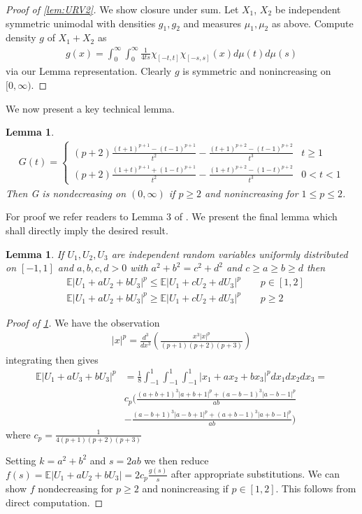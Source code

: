 \documentclass[10pt]{article}
\newcommand{\E}{\mathbb{E}}
\newcommand{\1}{\textbf{1}}
\newtheorem{lemma}[theorem]{Lemma}
\theoremstyle{remark}
\theoremstyle{definition}
\begin{document}
\begin{proof}[Proof of \ref{lem:URV2}]
	We show closure under sum. Let $X_1$, $X_2$ be independent symmetric unimodal with densities $g_1,g_2$ and measures $\mu_1,\mu_2$ as above. Compute density $g$ of $X_1 + X_2$ as 
	\begin{align*}
		g(x) = \int_0^{\infty} \int_0^{\infty} \frac{1}{4ts}\chi_{[-t,t]}  \chi_{[-s,s]}(x)d\mu(t)d\mu(s)
	\end{align*} via our Lemma representation. Clearly $g$ is symmetric and nonincreasing on $[0,\infty)$. 
\end{proof}

We now present a key technical lemma.

\begin{lemma}\label{lem:URV3}
	\begin{align*}
		G(t)=
		\begin{cases}
			(p+2)\frac{(t+1)^{p+1}-(t-1)^{p+1}}{t^2} - \frac{(t+1)^{p+2}-(t-1)^{p+2}}{t^3} & t \geq 1\\
			(p+2)\frac{(1+t)^{p+1}+(1-t)^{p+1}}{t^2} - \frac{(1+t)^{p+2}-(1-t)^{p+2}}{t^3} & 0 < t < 1
		\end{cases}
	\end{align*}
	Then G is nondecreasing on $(0,\infty)$ if $p \geq 2$ and nonincreasing for $1 \leq p \leq 2$. 
\end{lemma}

For proof we refer readers to Lemma 3 of \cite{LO}. We present the final lemma which shall directly imply the desired result.

\begin{lemma}\label{lem:URV4}
	If $U_1,U_2,U_3$ are independent random variables uniformly distributed on $[-1,1]$ and $a,b,c,d > 0$ with $a^2 + b^2 = c^2 + d^2$ and $c \geq a \geq b \geq d$ then
	\begin{align*}
		&\E |U_1 + aU_2 + bU_3|^p \leq \E |U_1 + cU_2 + dU_3|^p \qquad p \in [1,2] \\
		&\E|U_1 + aU_2 + bU_3|^p \geq \E|U_1 + cU_2 + dU_3|^p \qquad p \geq 2
	\end{align*}
\end{lemma}

\begin{proof}[Proof of \ref{lem:URV4}]
	We have the observation 
	\begin{align*}
		|x|^p = \frac{d^3}{dx^3}(\frac{x^3|x|^p}{(p+1)(p+2)(p+3)})
	\end{align*}
	integrating then gives
	\begin{align*}
		\E|U_1 + aU_3 + bU_3|^p &= \frac{1}{8}\int_{-1}^1\int_{-1}^1\int_{-1}^1|x_1 + ax_2 +bx_3|^p dx_1dx_2dx_3 =\\ &c_p(\frac{(a+b+1)^3|a+b+1|^p+(a-b-1)^3|a-b-1|^p}{ab} \\&- \frac{(a-b+1)^3|a-b+1|^p+(a+b-1)^3|a+b-1|^p}{ab})
	\end{align*}
	where $c_p = \frac{1}{4(p+1)(p+2)(p+3)}$

	Setting $k = a^2+b^2$ and $s = 2ab$ we then reduce $f(s) = \E|U_1+aU_2+bU_3| = 2c_p \frac{g(s)}{s}$ after appropriate substitutions. We can show $f$ nondecreasing for $p \geq 2$ and nonincreasing if $p \in [1,2]$. This follows from direct computation.
\end{proof}
\end{document}
